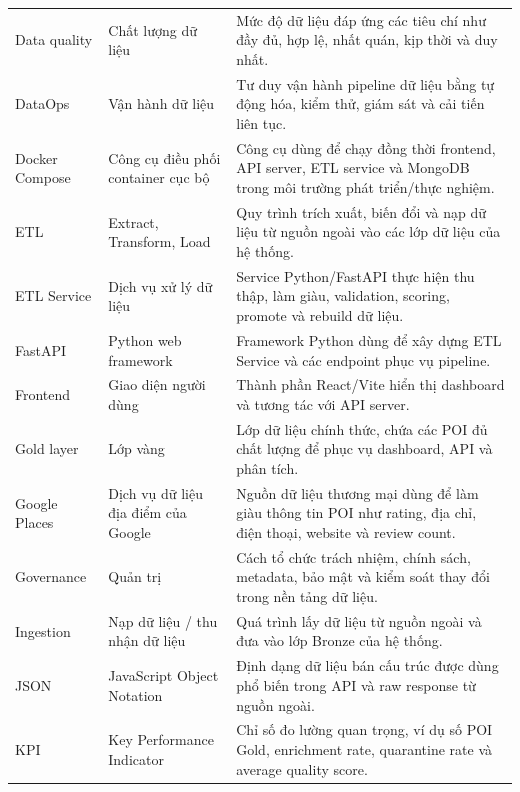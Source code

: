 \documentclass[12pt,a4paper]{article}
\begin{document}
\begin{longtable}{@{}p{}p{}p{}@{}}
Data quality & Chất lượng dữ liệu & Mức độ dữ liệu đáp ứng các tiêu chí như đầy đủ, hợp lệ, nhất quán, kịp thời và duy nhất. \\

DataOps & Vận hành dữ liệu & Tư duy vận hành pipeline dữ liệu bằng tự động hóa, kiểm thử, giám sát và cải tiến liên tục. \\

Docker Compose & Công cụ điều phối container cục bộ & Công cụ dùng để chạy đồng thời frontend, API server, ETL service và MongoDB trong môi trường phát triển/thực nghiệm. \\

ETL & Extract, Transform, Load & Quy trình trích xuất, biến đổi và nạp dữ liệu từ nguồn ngoài vào các lớp dữ liệu của hệ thống. \\

ETL Service & Dịch vụ xử lý dữ liệu & Service Python/FastAPI thực hiện thu thập, làm giàu, validation, scoring, promote và rebuild dữ liệu. \\

FastAPI & Python web framework & Framework Python dùng để xây dựng ETL Service và các endpoint phục vụ pipeline. \\

Frontend & Giao diện người dùng & Thành phần React/Vite hiển thị dashboard và tương tác với API server. \\

Gold layer & Lớp vàng & Lớp dữ liệu chính thức, chứa các POI đủ chất lượng để phục vụ dashboard, API và phân tích. \\

Google Places & Dịch vụ dữ liệu địa điểm của Google & Nguồn dữ liệu thương mại dùng để làm giàu thông tin POI như rating, địa chỉ, điện thoại, website và review count. \\

Governance & Quản trị & Cách tổ chức trách nhiệm, chính sách, metadata, bảo mật và kiểm soát thay đổi trong nền tảng dữ liệu. \\

Ingestion & Nạp dữ liệu / thu nhận dữ liệu & Quá trình lấy dữ liệu từ nguồn ngoài và đưa vào lớp Bronze của hệ thống. \\

JSON & JavaScript Object Notation & Định dạng dữ liệu bán cấu trúc được dùng phổ biến trong API và raw response từ nguồn ngoài. \\

KPI & Key Performance Indicator & Chỉ số đo lường quan trọng, ví dụ số POI Gold, enrichment rate, quarantine rate và average quality score. \\


\end{longtable}
\end{document}

